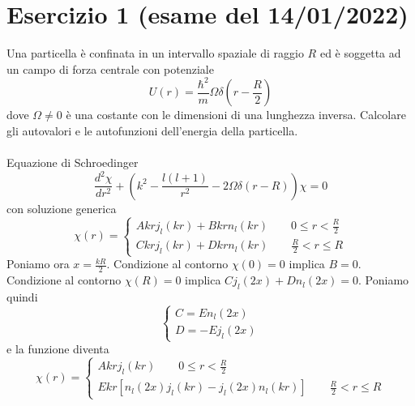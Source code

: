 \documentclass[a4paper]{article}
\begin{document}
    \section*{Esercizio 1 (esame del 14/01/2022)}
        Una particella è confinata in un intervallo spaziale di raggio $R$ ed è soggetta ad un campo di forza centrale con potenziale
        \begin{equation*}
            U(r)=\frac{\hbar^2}{m}\Omega\delta(r-\frac{R}{2})
        \end{equation*}
        dove $\Omega\neq 0$ è una costante con le dimensioni di una lunghezza inversa.
        Calcolare gli autovalori e le autofunzioni dell'energia della particella.
        \\
        \\
        Equazione di Schroedinger
        \begin{equation*}
            \frac{d^2\chi}{dr^2}+\left(k^2-\frac{l(l+1)}{r^2}-2\Omega\delta(r-R)\right)\chi=0
        \end{equation*}
        con soluzione generica
        \begin{equation*}
            \chi(r)=
            \begin{cases}
                Akrj_l(kr)+Bkrn_l(kr)\quad\quad 0\leq r<\frac{R}{2}\\
                Ckrj_l(kr)+Dkrn_l(kr)\quad\quad \frac{R}{2}<r\leq R
            \end{cases}
        \end{equation*}
        Poniamo ora $x=\frac{kR}{2}$.
        Condizione al contorno $\chi(0)=0$ implica $B=0$.
        Condizione al contorno $\chi(R)=0$ implica $Cj_l(2x)+Dn_l(2x)=0$.
        Poniamo quindi
        \begin{equation*}
            \begin{cases}
                C=En_l(2x)\\
                D=-Ej_l(2x)
            \end{cases}
        \end{equation*}
        e la funzione diventa
        \begin{equation*}
            \chi(r)=
            \begin{cases}
                Akrj_l(kr)\quad\quad 0\leq r<\frac{R}{2}\\
                Ekr\left[n_l(2x)j_l(kr)-j_l(2x)n_l(kr)\right]\quad\quad \frac{R}{2}<r\leq R
            \end{cases}
        \end{equation*}
\end{document}
